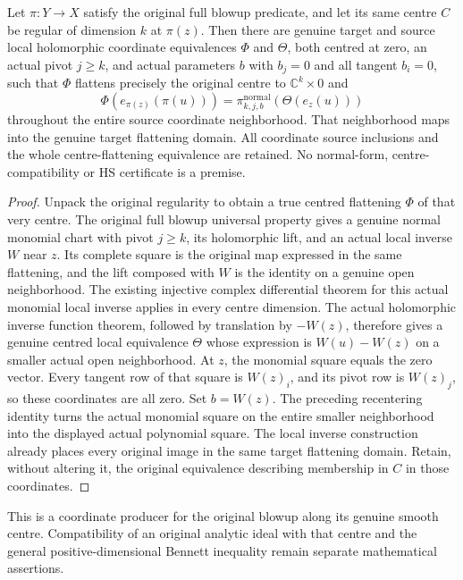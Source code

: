 \begin{theorem}
\label{hir:actual-smooth-centre-blowup-coordinate-normal-form}
\leanok
Let $\pi:Y\to X$ satisfy the original full blowup predicate, and let
its same centre $C$ be regular of dimension $k$ at $\pi(z)$. Then there
are genuine target and source local holomorphic coordinate equivalences
$\Phi$ and $\Theta$, both centred at zero, an actual pivot $j\ge k$,
and actual parameters $b$ with $b_j=0$ and all tangent $b_i=0$, such
that $\Phi$ flattens precisely the original centre to
$\mathbb C^k\times0$ and
\[
 \Phi(e_{\pi(z)}(\pi(u)))
 =\pi^{\mathrm{normal}}_{k,j,b}(\Theta(e_z(u)))
\]
throughout the entire source coordinate neighborhood. That neighborhood
maps into the genuine target flattening domain. All coordinate source
inclusions and the whole centre-flattening equivalence are retained.
No normal-form, centre-compatibility or HS certificate is a premise.
\end{theorem}
\begin{proof}
Unpack the original regularity to obtain a true centred flattening
$\Phi$ of that very centre. The original full blowup universal property
gives a genuine normal monomial chart with pivot $j\ge k$, its
holomorphic lift, and an actual local inverse $W$ near $z$. Its complete
square is the original map expressed in the same flattening, and the
lift composed with $W$ is the identity on a genuine open neighborhood.
The existing injective complex differential theorem for this actual
monomial local inverse applies in every centre dimension. The actual
holomorphic inverse function theorem, followed by translation by
$-W(z)$, therefore gives a genuine centred local equivalence $\Theta$
whose expression is $W(u)-W(z)$ on a smaller actual open neighborhood.
At $z$, the monomial square equals the zero vector. Every tangent row
of that square is $W(z)_i$, and its pivot row is $W(z)_j$, so these
coordinates are all zero. Set $b=W(z)$. The preceding recentering
identity turns the actual monomial square on the entire smaller
neighborhood into the displayed actual polynomial square. The local
inverse construction already places every original image in the same
target flattening domain. Retain, without altering it, the original
equivalence describing membership in $C$ in those coordinates.
\end{proof}

This is a coordinate producer for the original blowup along its genuine
smooth centre. Compatibility of an original analytic ideal with that
centre and the general positive-dimensional Bennett inequality remain
separate mathematical assertions.
